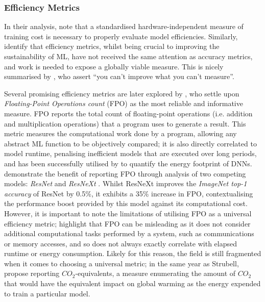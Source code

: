 \documentclass[a4paper, 12pt]{article}
\begin{document}
    \subsubsection{Efficiency Metrics}

    In their analysis, \citet{strubell-2019} note that a standardised hardware-independent measure of training cost is necessary to properly evaluate model efficiencies. Similarly, \citet{buchanan-2021} identify that efficiency metrics, whilst being crucial to improving the sustainability of ML, have not received the same attention as accuracy metrics, and work is needed to expose a globally viable measure. This is nicely summarised by \citet{schwartz-2019}, who assert ``you can't improve what you can't measure”.

    Several promising efficiency metrics are later explored by \citet{schwartz-2019}, who settle upon \emph{Floating-Point Operations count} (FPO) as the most reliable and informative measure. FPO reports the total count of floating-point operations (i.e. addition and multiplication operations) that a program uses to generate a result. This metric measures the computational work done by a program, allowing any abstract ML function to be objectively compared; it is also directly correlated to model runtime, penalising inefficient models that are executed over long periods, and has been successfully utilised by \citet{veniat-denoyer-2017} to quantify the energy footprint of DNNs. \citet{schwartz-2019} demonstrate the benefit of reporting FPO through analysis of two competing models: \emph{ResNet} \citep{he-2015} and \emph{ResNeXt} \citep{xie-2016}. Whilst ResNeXt improves the \emph{ImageNet top-1 accuracy} of ResNet by 0.5\%, it exhibits a 35\% increase in FPO, contextualising the performance boost provided by this model against its computational cost. However, it is important to note the limitations of utilising FPO as a universal efficiency metric; \citet{veniat-denoyer-2017} highlight that FPO can be misleading as it does not consider additional computational tasks performed by a system, such as communications or memory accesses, and so does not always exactly correlate with elapsed runtime or energy consumption. Likely for this reason, the field is still fragmented when it comes to choosing a universal metric; in the same year as Strubell, \citet{lacoste-2019} propose reporting $CO_2$-equivalents, a measure enumerating the amount of $CO_2$ that would have the equivalent impact on global warming as the energy expended to train a particular model.
\end{document}
